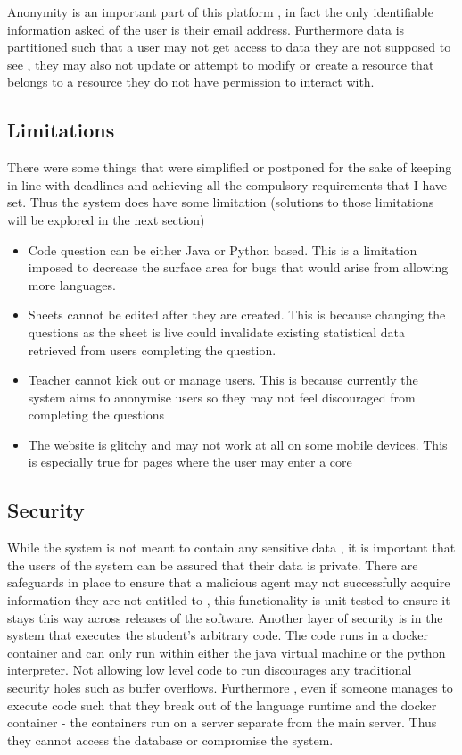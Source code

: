 Anonymity is an important part of this platform , in fact the only identifiable information asked of the user is their email address. Furthermore data is partitioned such that a user may not get access to data they are not supposed to see , they may also not update or attempt to modify or create a resource that belongs to a resource they do not have permission to interact with.

\subsection{Limitations}
There were some things that were simplified or postponed for the sake of keeping in line with deadlines and achieving all the compulsory requirements that I have set. Thus the system does have some limitation (solutions to those limitations will be explored in the next section)

\begin{itemize}
	\item Code question can be either Java or Python based. This is a limitation imposed to decrease the surface area for bugs that would arise from allowing more languages.
	\item Sheets cannot be edited after they are created. This is because changing the questions as the sheet is live could invalidate existing statistical data retrieved from users completing the question.
	\item Teacher cannot kick out or manage users. This is because currently the system aims to anonymise users so they may not feel discouraged from completing the questions
	\item The website is glitchy and may not work at all on some mobile devices. This is especially true for pages where the user may enter a core
\end{itemize}

\subsection{Security}
While the system is not meant to contain any sensitive data , it is important that the users of the system can be assured that their data is private. 
There are safeguards in place to ensure that a malicious agent may not successfully acquire information they are not entitled to , this functionality is unit tested to ensure it stays this way across releases of the software.
Another layer of security is in the system that executes the student's arbitrary code.
The code runs in a docker container and can only run within either the java virtual machine or the python interpreter. Not allowing low level code to run discourages any traditional security holes such as buffer overflows.
Furthermore , even if someone manages to execute code such that they break out of the language runtime and the docker container - the containers run on a server separate from the main server. Thus they cannot access the database or compromise the system.

